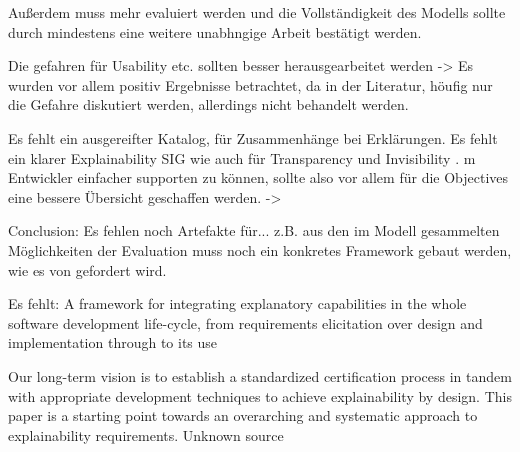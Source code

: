 Außerdem muss mehr evaluiert werden und die Vollständigkeit des Modells sollte durch mindestens eine weitere unabhngige Arbeit bestätigt werden.

Die gefahren für Usability etc. sollten besser herausgearbeitet werden -> Es wurden vor allem positiv Ergebnisse betrachtet, da in der Literatur, höufig nur die Gefahre diskutiert werden, allerdings nicht behandelt werden.

Es fehlt ein ausgereifter Katalog, für Zusammenhänge bei Erklärungen. Es fehlt ein klarer Explainability SIG wie auch für Transparency \cite{do2010software} und Invisibility \cite{carvalho2020developers}. m Entwickler einfacher supporten zu können, sollte also vor allem für die Objectives eine bessere Übersicht geschaffen werden. ->

Conclusion: Es fehlen noch Artefakte für... z.B. aus den im Modell gesammelten Möglichkeiten der Evaluation muss noch ein konkretes Framework gebaut werden, wie es von \citeauthor{sokol_explainability_2020} gefordert wird.

Es fehlt: A framework for integrating explanatory capabilities in the whole software development life-cycle, from requirements elicitation over design and implementation through to its use \cite{cassens_ambient_2019}

Our long-term vision is to establish a standardized certification process in tandem with appropriate development techniques to achieve explainability by design. This paper is a starting point towards an overarching and systematic approach to explainability requirements. Unknown source